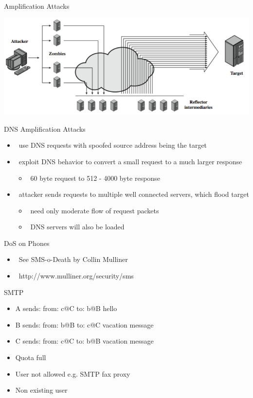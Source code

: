\documentclass{beamer}
\begin{document}
\begin{frame}{Amplification Attacks}
  \begin{center}
  \includegraphics[width=0.8\linewidth]{amplification}
  \end{center}
\end{frame}

\begin{frame}{DNS Amplification Attacks }
  \begin{itemize}
  \item  use DNS requests with spoofed source 
    address being the target 
  \item  exploit DNS behavior to convert a small 
    request to a much larger response 
    \begin{itemize}
    \item  60 byte request to 512 - 4000 byte response 
    \end{itemize}
  \item  attacker sends requests to multiple well 
    connected servers, which flood target 
    \begin{itemize}
    \item  need only moderate flow of request packets 
    \item  DNS servers will also be loaded 
    \end{itemize}
  \end{itemize}
\end{frame}



\begin{frame}{DoS on Phones}
  \begin{itemize}
  \item  See SMS-o-Death by Collin Mulliner 
  \item  http://www.mulliner.org/security/sms
  \end{itemize}
\end{frame}


\begin{frame}{SMTP}
  \begin{itemize}
  \item A sends: from: c@C to: b@B hello
  \item B sends: from: b@B to: c@C vacation message
  \item C sends: from: c@C to: b@B vacation message
  \item Quota full
  \item User not allowed e.g. SMTP fax proxy
  \item Non existing user
  \end{itemize}
\end{frame}
\end{document}
